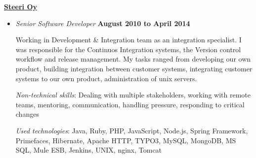 \documentclass[10pt,english,a4paper]{article}
\newenvironment{outerlist}[1][\enskip\textbullet]%
        {\begin{itemize}[#1]}{\end{itemize}%
         \vspace{-.6\baselineskip}}
\newcommand{\blankline}{\quad\pagebreak[2]}
\begin{document}
\href{http://steeri.fi/}{\textbf{Steeri Oy}}
\begin{outerlist}
  \item[] \textit{Senior Software Developer}%
  \hfill \textbf{August 2010 to April 2014}\par
    Working in Development \& Integration team as an integration specialist.
    I was responsible for the Continuos Integration systems, the Version control workflow
    and release management. My tasks ranged from developing our own product,
    building integration between customer systems, integrating customer systems
    to our own product, administration of unix servers.
    \par

    \emph{Non-technical skills}: Dealing with multiple stakeholders, working with remote teams, mentoring, communication, handling pressure, responding to critical changes
    \par
    \emph{Used technologies}: Java, Ruby, PHP, JavaScript, Node.js, Spring Framework, Primefaces, Hibernate, Apache HTTP, TYPO3, MySQL, MongoDB, MS SQL, Mule ESB, Jenkins, UNIX, nginx, Tomcat
\end{outerlist}
\blankline
\end{document}
